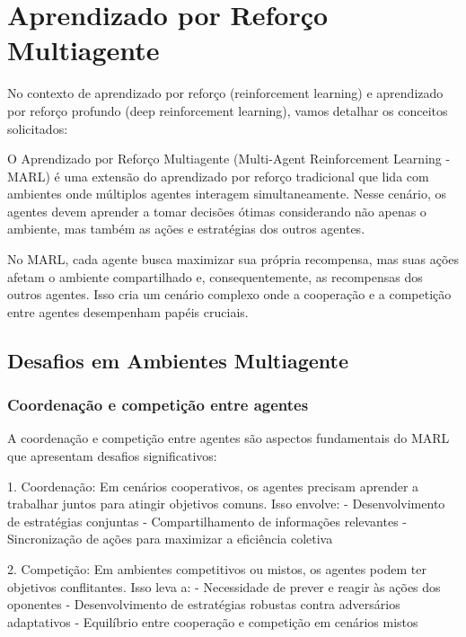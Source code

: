 \section{Aprendizado por Reforço Multiagente}
\label{sec:marl}

No contexto de aprendizado por reforço (reinforcement learning) e aprendizado por reforço profundo (deep reinforcement learning), vamos detalhar os conceitos solicitados:

O Aprendizado por Reforço Multiagente (Multi-Agent Reinforcement Learning - MARL) é uma extensão do aprendizado por reforço tradicional que lida com ambientes onde múltiplos agentes interagem simultaneamente\cite{azadeh2024advancesmultiagentreinforcementlearning,baheri2024synergyoptimaltransporttheory}. Nesse cenário, os agentes devem aprender a tomar decisões ótimas considerando não apenas o ambiente, mas também as ações e estratégias dos outros agentes.

No MARL, cada agente busca maximizar sua própria recompensa, mas suas ações afetam o ambiente compartilhado e, consequentemente, as recompensas dos outros agentes\cite{Li2023RACEIM,wang2024multipleshipscooperativenavigation}. Isso cria um cenário complexo onde a cooperação e a competição entre agentes desempenham papéis cruciais.

\subsection{Desafios em Ambientes Multiagente}
\label{subsec:desafios_multi}

\subsubsection{Coordenação e competição entre agentes}
\label{subsubsec:coordenacao}

A coordenação e competição entre agentes são aspectos fundamentais do MARL que apresentam desafios significativos:

1. Coordenação: Em cenários cooperativos, os agentes precisam aprender a trabalhar juntos para atingir objetivos comuns\cite{Li2023RACEIM}. Isso envolve:
   - Desenvolvimento de estratégias conjuntas
   - Compartilhamento de informações relevantes
   - Sincronização de ações para maximizar a eficiência coletiva

2. Competição: Em ambientes competitivos ou mistos, os agentes podem ter objetivos conflitantes\cite{baheri2024synergyoptimaltransporttheory}. Isso leva a:
   - Necessidade de prever e reagir às ações dos oponentes
   - Desenvolvimento de estratégias robustas contra adversários adaptativos
   - Equilíbrio entre cooperação e competição em cenários mistos

